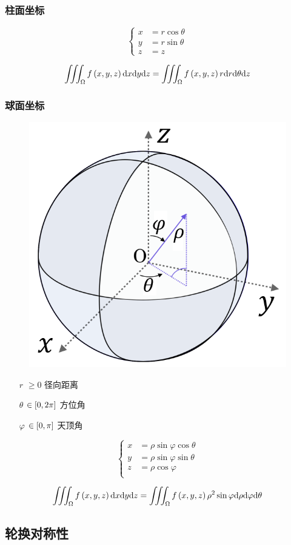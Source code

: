\documentclass{article}
\begin{document}
\subsubsection{柱面坐标}

\[\left\{\begin{aligned}
        x & =r\cos\theta \\
        y & =r\sin\theta \\
        z & =z
    \end{aligned}\right.\]

\[\iiint_\Omega f\left(x,y,z\right)\mathrm d x\mathrm d y\mathrm d z=
    \iiint_\Omega f\left(x,y,z\right)r\mathrm d r\mathrm d\theta\mathrm d z\]

\subsubsection{球面坐标}

\begin{figure}[H]
    \centering
    \includegraphics[width=0.2\linewidth]{SphericalCoordinates.png}
\end{figure}

\begin{enumerate}
    \item[$r$] $\geqslant0$ 径向距离
    \item[$\theta$] $\in\left[0,2\pi\right]$ 方位角
    \item[$\varphi$] $\in\left[0,\pi\right]$ 天顶角
\end{enumerate}

\[\left\{\begin{aligned}
        x & =\rho\sin\varphi\cos\theta \\
        y & =\rho\sin\varphi\sin\theta \\
        z & =\rho\cos\varphi           \\
    \end{aligned}\right.\]

\[\iiint_\Omega f\left(x,y,z\right)\mathrm d x\mathrm d y\mathrm d z=
    \iiint_\Omega f\left(x,y,z\right)\rho^2\sin\varphi\mathrm d\rho\mathrm d\varphi\mathrm d\theta\]

\subsection{轮换对称性}
\end{document}
